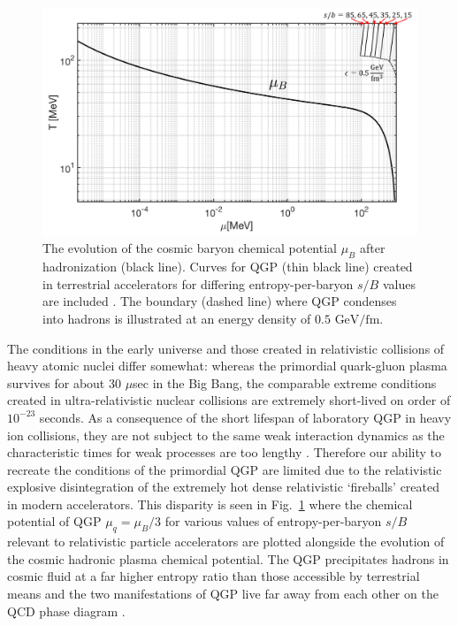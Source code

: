 \documentclass[universe,article,submit,moreauthors,pdftex,a4paper]{Definitions/mdpi}
\newcommand{\GeV}{\text{ GeV}}
\newcommand*{\rf}[1]{Fig.~{\ref{#1}}}
\begin{document}
\begin{figure}[h]
  \centering
  \includegraphics[width=\textwidth]{./plots/phaseQGP}
  \caption{The evolution of the cosmic baryon chemical potential $\mu_{B}$ after hadronization (black line). Curves for QGP (thin black line) created in terrestrial accelerators for differing entropy-per-baryon $s/B$ values are included \cite{Rafelski:1987nv}. The boundary (dashed line) where QGP condenses into hadrons is illustrated at an energy density of $0.5\GeV/\mathrm{fm}$.}
  \label{phaseQGP} 
\end{figure}


The conditions in the early universe and those created in relativistic collisions of heavy atomic nuclei differ somewhat: whereas the primordial quark-gluon plasma survives for about 30 $\mu$sec in the Big Bang, the comparable extreme conditions created in ultra-relativistic nuclear collisions are extremely short-lived \cite{Rafelski:2001hp} on order of $10^{-23}$ seconds. As a consequence of the short lifespan of laboratory QGP in heavy ion collisions, they are not subject to the same weak interaction dynamics as the characteristic times for weak processes are too lengthy \cite{Rafelski:1982ii}. Therefore our ability to recreate the conditions of the primordial QGP are limited due to the relativistic explosive disintegration of the extremely hot dense relativistic `fireballs' created in modern accelerators. This disparity is seen in \rf{phaseQGP} where the chemical potential of QGP $\mu_{q}=\mu_{B}/3$ \cite{Rafelski:1987nv} for various values of entropy-per-baryon $s/B$ relevant to relativistic particle accelerators are plotted alongside the evolution of the cosmic hadronic plasma chemical potential. The QGP precipitates hadrons in cosmic fluid at a far higher entropy ratio than those accessible by terrestrial means and the two manifestations of QGP live far away from each other on the QCD phase diagram \cite{Braun-Munzinger:2008szb,Jacak:2012dx}.
\end{document}
